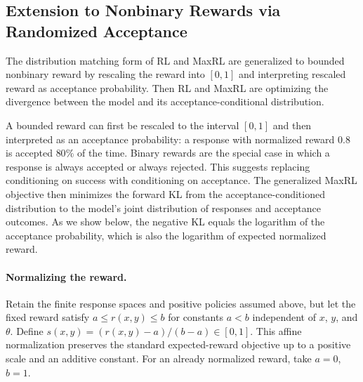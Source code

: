 \subsection{Extension to Nonbinary Rewards via Randomized Acceptance}
\label{app:randomized-reward-extension}

\begin{insight}
  The distribution matching form of RL and MaxRL are generalized to bounded nonbinary reward by rescaling the reward into $[0, 1]$ and interpreting rescaled reward as acceptance probability. Then RL and MaxRL are optimizing the divergence between the model and its acceptance-conditional distribution.
\end{insight}

A bounded reward can first be rescaled to the interval $[0,1]$ and then
interpreted as an acceptance probability: a response with normalized
reward $0.8$ is accepted $80\%$ of the time. Binary rewards are the
special case in which a response is always accepted or always rejected.
This suggests replacing conditioning on success with conditioning on
acceptance. The generalized MaxRL objective then minimizes the forward
KL from the acceptance-conditioned distribution to the model's joint
distribution of responses and acceptance outcomes. As we show below,
the negative KL equals the logarithm of the acceptance probability,
which is also the logarithm of expected normalized reward.

\paragraph{Normalizing the reward.}
Retain the finite response spaces and positive policies assumed above,
but let the fixed
reward satisfy $a\le r(x,y)\le b$ for constants $a<b$ independent of
$x$, $y$, and $\theta$. Define
$s(x,y)=(r(x,y)-a)/(b-a)\in[0,1]$. This affine normalization preserves
the standard expected-reward objective up to a positive scale and an
additive constant. For an already normalized reward, take $a=0$, $b=1$.

